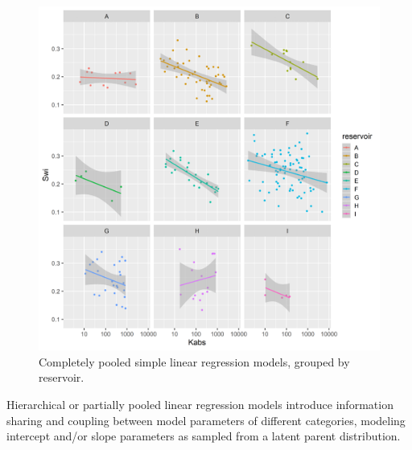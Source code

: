 \documentclass[english,msc,numbers]{coppe}
\begin{document}
  \begin{figure}
  
  {\centering \includegraphics[width=0.9\linewidth]{figure/4-7-completely-pooled} 
  
  }
  
  \caption{Completely pooled simple linear regression models, grouped by reservoir.}\label{fig:completely-pooled}
  \end{figure}
  \par
  
  Hierarchical or partially pooled linear regression models introduce information sharing and coupling between model parameters of different categories, modeling intercept and/or slope parameters as sampled from a latent parent distribution.
  
\end{document}
